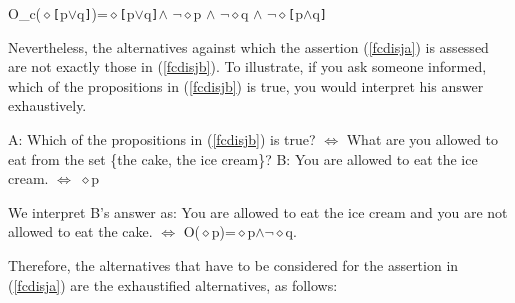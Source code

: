 \documentclass[a4paper,11pt]{article}
\begin{document}
\begin{exe}
\ex\label{fccontr} O_c($\diamond$\verb![!p$\vee$q\verb!]!)=$\diamond$\verb![!p$\vee$q\verb!]!$\wedge$ $\neg\diamond$p $\wedge$ $\neg\diamond$q $\wedge$ $\neg\diamond$\verb![!p$\wedge$q\verb!]!
\end{exe}
Nevertheless, the alternatives against which the assertion (\ref{fcdisja}) is assessed are not exactly those in (\ref{fcdisjb}).
To illustrate, if you ask someone informed, which of the propositions in (\ref{fcdisjb}) is true, you would interpret his answer exhaustively.
\begin{exe}
\ex\label{questalt} \begin{xlist}
\ex\label{questalta} A: Which of the propositions in (\ref{fcdisjb}) is true? $\Leftrightarrow$ What are you allowed to eat from the set \{the cake, the ice cream\}?
\ex\label{questaltb} B: You are allowed to eat the ice cream. $\Leftrightarrow$ $\diamond$p
\end{xlist}
\end{exe}
We interpret B's answer as: You are allowed to eat the ice cream and you are not allowed to eat the cake. $\Leftrightarrow$ O($\diamond$p)=$\diamond$p$\wedge$$\neg\diamond$q.

Therefore, the alternatives that have to be considered for the assertion in (\ref{fcdisja}) are the exhaustified alternatives, as follows:
\end{document}

